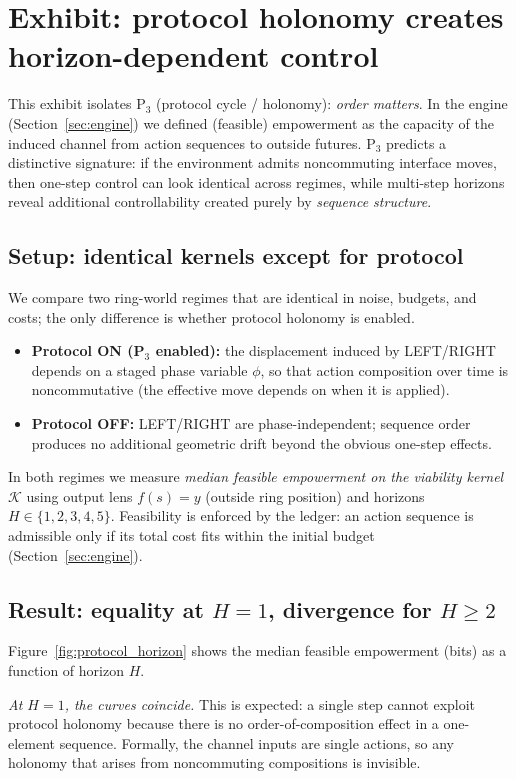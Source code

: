 \documentclass[11pt]{article}
\newcommand{\K}{\mathcal{K}}
\begin{document}
 \section{Exhibit: protocol holonomy creates horizon-dependent control}
\label{sec:ex_holonomy}

This exhibit isolates P$_3$ (protocol cycle / holonomy): \emph{order matters}. In the engine (Section~\ref{sec:engine}) we defined (feasible) empowerment as the capacity of the induced channel from action sequences to outside futures. P$_3$ predicts a distinctive signature: if the environment admits noncommuting interface moves, then one-step control can look identical across regimes, while multi-step horizons reveal additional controllability created purely by \emph{sequence structure}.

\subsection{Setup: identical kernels except for protocol}
We compare two ring-world regimes that are identical in noise, budgets, and costs; the only difference is whether protocol holonomy is enabled.
\begin{itemize}[leftmargin=*, itemsep=0.25em]
  \item \textbf{Protocol ON (P$_3$ enabled):} the displacement induced by LEFT/RIGHT depends on a staged phase variable $\phi$, so that action composition over time is noncommutative (the effective move depends on when it is applied).
  \item \textbf{Protocol OFF:} LEFT/RIGHT are phase-independent; sequence order produces no additional geometric drift beyond the obvious one-step effects.
\end{itemize}
In both regimes we measure \emph{median feasible empowerment on the viability kernel} $\K$ using output lens $f(s)=y$ (outside ring position) and horizons $H\in\{1,2,3,4,5\}$. Feasibility is enforced by the ledger: an action sequence is admissible only if its total cost fits within the initial budget (Section~\ref{sec:engine}).

\subsection{Result: equality at $H=1$, divergence for $H\ge 2$}
Figure~\ref{fig:protocol_horizon} shows the median feasible empowerment (bits) as a function of horizon $H$.

\emph{At $H=1$, the curves coincide.} This is expected: a single step cannot exploit protocol holonomy because there is no order-of-composition effect in a one-element sequence. Formally, the channel inputs are single actions, so any holonomy that arises from noncommuting compositions is invisible.
\end{document}
